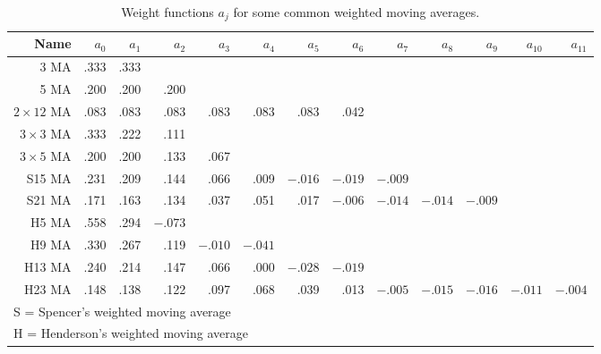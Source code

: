\documentclass[a4paper,10pt]{article}
\begin{document}
\begin{table}[!b]
	\caption{Weight functions $a_j$ for some common weighted moving averages.}\label{table:weights}
	{\begin{small}\setlength{\tabcolsep}{0.15cm}
			\begin{tabular}{rrrrrrrrrrrrr}
				\hline
				\bf Name       & $a_0$    & $a_1$    & $a_2$   & $a_3$   & $a_4$
				               & $a_5$    & $a_6$    & $a_7$   & $a_8$   & $a_9$
				               & $a_{10}$ & $a_{11}$                               \\
				\hline
				3 MA           & .333     & .333                                   \\
				5 MA           & .200     & .200     & .200                        \\
				$2\times12$ MA & .083     & .083     & .083    & .083    & .083
				               & .083     & .042                                   \\
				$3\times3$ MA  & .333     & .222     & .111                        \\
				$3\times5$ MA  & .200     & .200     & .133    & .067              \\
				S15 MA         & .231     & .209     & .144    & .066    & .009
				               & $-.016$  & $-.019$  & $-.009$                     \\
				S21 MA         & .171     & .163     & .134    & .037    & .051
				               & .017     & $-.006$  & $-.014$ & $-.014$ & $-.009$ \\
				H5 MA          & .558     & .294     & $-.073$                     \\
				H9 MA          & .330     & .267     & .119    & $-.010$ & $-.041$ \\
				H13 MA         & .240     & .214     & .147    & .066    & .000
				               & $-.028$  & $-.019$                                \\
				H23 MA         & .148     & .138     & .122    & .097    & .068
				               & .039     & .013     & $-.005$ & $-.015$ & $-.016$
				               & $-.011$  & $-.004$                                \\
				\hline
				\multicolumn{9}{l}{S = Spencer's weighted moving average}          \\
				\multicolumn{9}{l}{H = Henderson's weighted moving average}        \\
				\hline
			\end{tabular}\end{small}
	}\end{table}
\end{document}
